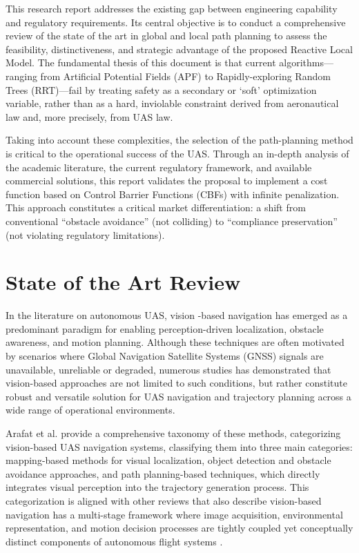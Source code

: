 \documentclass[a4paper, 11pt]{article}
\begin{document}
This research report addresses the existing gap between engineering capability and regulatory requirements. Its central objective is to conduct a comprehensive review of the state of the art in global and local path planning to assess the feasibility, distinctiveness, and strategic advantage of the proposed Reactive Local Model. The fundamental thesis of this document is that current algorithms—ranging from Artificial Potential Fields (APF) to Rapidly-exploring Random Trees (RRT)—fail by treating safety as a secondary or ‘soft’ optimization variable, rather than as a hard, inviolable constraint derived from aeronautical law and, more precisely, from UAS law.

Taking into account these complexities, the selection of the path-planning method is critical to the operational success of the UAS. Through an in-depth analysis of the academic literature, the current regulatory framework, and available commercial solutions, this report validates the proposal to implement a cost function based on Control Barrier Functions (CBFs) with infinite penalization. This approach constitutes a critical market differentiation: a shift from conventional “obstacle avoidance” (not colliding) to “compliance preservation” (not violating regulatory limitations).

\section{State of the Art Review}

In the literature on autonomous UAS, vision -based navigation has emerged as a predominant paradigm for enabling perception-driven localization, obstacle awareness, and motion planning. Although these techniques are often motivated by scenarios where Global Navigation Satellite Systems (GNSS) signals are unavailable, unreliable or degraded, numerous studies has demonstrated that vision-based approaches are not limited to such conditions, but rather constitute robust and versatile solution for UAS navigation and trajectory planning across a wide range of operational environments.

 Arafat et al. \cite{arafat2023vision} provide a comprehensive taxonomy of these methods, categorizing vision-based UAS navigation systems, classifying them into three main categories: mapping-based methods for visual localization, object detection and obstacle avoidance approaches, and path planning-based techniques, which directly integrates visual perception into the trajectory generation process. This categorization is aligned with other reviews that also describe vision-based navigation has a multi-stage framework where image acquisition, environmental representation, and motion decision processes are tightly coupled yet conceptually distinct components of autonomous flight systems \cite{huang2025investigation}.
\end{document}
